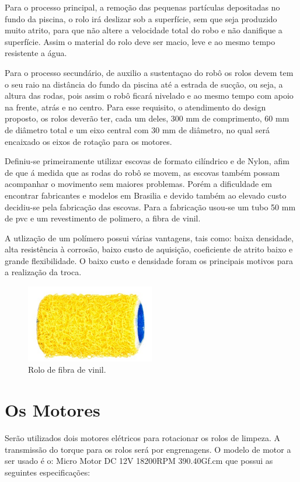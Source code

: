 Para o processo principal, a remoção das pequenas partículas depositadas no fundo da piscina, o rolo irá deslizar sob a superfície, sem que seja produzido muito atrito, para que não altere a velocidade total do robo e não danifique a superfície. Assim o material do rolo deve ser macio, leve e ao mesmo tempo resistente a água.

Para o processo secundário, de auxilio a sustentaçao do robô os rolos devem tem o seu raio na distância do fundo da piscina até a estrada de sucção, ou seja, a altura das rodas, pois assim o robô ficará nivelado e ao mesmo tempo com apoio na frente, atrás e no centro. Para esse requisito, o atendimento do design proposto, os rolos deverão ter, cada um deles, 300 mm de comprimento, 60 mm de diâmetro total e um eixo central com 30 mm de diâmetro, no qual será encaixado os eixos de rotação para os motores.

Definiu-se primeiramente utilizar escovas de formato cilíndrico e de Nylon, afim de que á medida que as rodas do robô se movem, as escovas também possam acompanhar o movimento sem maiores problemas. Porém a dificuldade em encontrar fabricantes e modelos em Brasilia e devido também ao elevado custo decidiu-se pela fabricação das escovas. Para a fabricação usou-se um tubo 50 mm de pvc e um revestimento de polimero, a fibra de vinil. 

A utlização de um polímero possui várias vantagens, tais como: baixa densidade, alta resistência à corrosão, baixo custo de aquisição, coeficiente de atrito baixo e grande flexibilidade. O baixo custo e densidade foram os principais motivos para a realização da troca.
\par
  \begin{figure}[h]
    \centering
    \includegraphics[width=0.5\textwidth]{figures/brush-vinil.png}
    \caption{Rolo de fibra de vinil.}
    \label{fig:brush-vinil}
  \end{figure}
  \FloatBarrier
\par

\section{Os Motores}
Serão utilizados dois motores elétricos para rotacionar os rolos de limpeza. A transmissão do torque para os rolos será por engrenagens. O modelo de motor a ser usado é o: Micro Motor DC 12V 18200RPM 390.40Gf.cm que possui as seguintes especificações:

